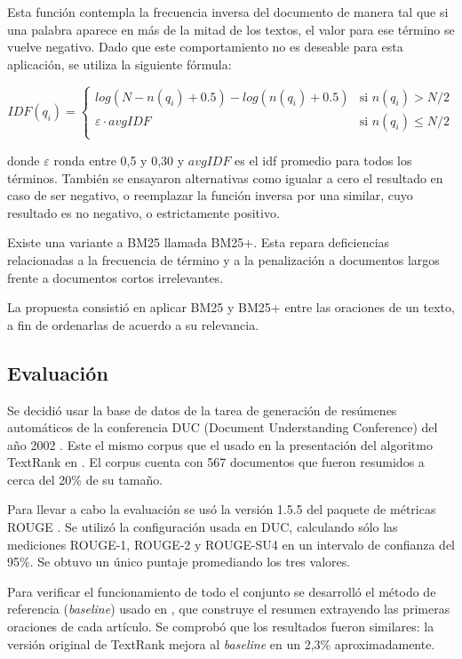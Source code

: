 \documentclass{llncs}
\begin{document}
Esta función contempla la frecuencia inversa del documento de manera tal que si una palabra aparece en más de la mitad de los textos, el valor para ese término se vuelve negativo. Dado que este comportamiento no es deseable para esta aplicación, se utiliza la siguiente fórmula:
                
\begin{equation}
 IDF(q_i) =
  \begin{cases}
       log(N - n(q_i) + 0.5) - log(n(q_i) + 0.5)    & \text{si }  n(q_i) > N/2\\
       \varepsilon \cdot avgIDF                     & \text{si }  n(q_i) \leq N/2\\
  \end{cases}
\end{equation}                
                
donde $\varepsilon$ ronda entre 0,5 y 0,30 y $avgIDF$ es el idf promedio para todos los términos.
También se ensayaron alternativas como igualar a cero el resultado en caso de ser negativo, o reemplazar la función inversa por una similar, cuyo resultado es no negativo, o estrictamente positivo. 

Existe una variante a BM25 llamada BM25+. Esta repara deficiencias relacionadas a la frecuencia de término y a la penalización a documentos largos frente a documentos cortos irrelevantes.

La propuesta consistió en aplicar BM25 y BM25+ entre las oraciones de un texto, a fin de ordenarlas de acuerdo a su relevancia.


\subsection{Evaluación}
Se decidió usar la base de datos de la tarea de generación de resúmenes automáticos de la conferencia DUC (Document Understanding Conference) del año 2002 \cite{duc2002-guidelines}. Este el mismo corpus que el usado en la presentación del algoritmo TextRank en \cite{mihalcea-tarau}. El corpus cuenta con 567 documentos que fueron resumidos a cerca del 20\% de su tamaño.

Para llevar a cabo la evaluación se usó la versión 1.5.5 del paquete de métricas ROUGE \cite{Lin2004a}. Se utilizó la configuración usada en DUC, calculando sólo las mediciones ROUGE-1, ROUGE-2 y ROUGE-SU4 en un intervalo de confianza del 95\%. Se obtuvo un único puntaje promediando los tres valores.

Para verificar el funcionamiento de todo el conjunto se desarrolló el método de referencia (\textit{baseline}) usado en \cite{mihalcea-tarau}, que construye el resumen extrayendo las primeras oraciones de cada artículo. Se comprobó que los resultados fueron similares: la versión original de TextRank mejora al \textit{baseline} en un 2,3\% aproximadamente.
\end{document}
